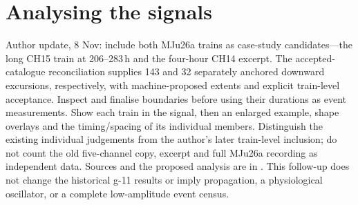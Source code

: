 \chapter{Analysing the signals}
\label{ch:roundb}

\begin{instructions}
Author update, 8 Nov: include both MJu26a trains as case-study candidates---the long CH15 train at 206--283\,h and
the four-hour CH14 excerpt. The accepted-catalogue reconciliation supplies 143 and 32 separately anchored
downward excursions, respectively, with machine-proposed extents and explicit train-level acceptance. Inspect
and finalise boundaries before using their durations as event measurements. Show each train in the signal,
then an enlarged example, shape overlays and the timing/spacing of its individual members. Distinguish the
existing individual judgements from the author's later train-level inclusion; do not count the old five-channel
copy, excerpt and full MJu26a recording as independent data. Sources and the proposed analysis are in
. This follow-up does not change the historical g-11 results
or imply propagation, a physiological oscillator, or a complete low-amplitude event census.
\end{instructions}

